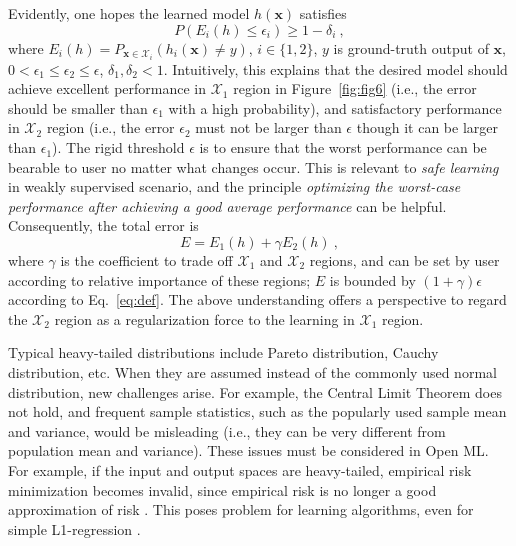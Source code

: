 \documentclass[review,11pt]{ReportTemplate}
\begin{document}
Evidently, one hopes the learned model $h(\bm{x})$ satisfies
\begin{equation}\label{eq:def}
P(E_i(h) \leq \epsilon_i) \geq 1-\delta_i \ ,
\end{equation}
where $E_i(h) = P_{\bm{x} \in \mathcal{X}_i} \left(h_i(\bm{x}) \neq y\right)$, $i \in \{1,2\}$, $y$ is ground-truth output of $\bm{x}$, $0 < \epsilon_1 \le \epsilon_2 \le \epsilon$,  $\delta_1, \delta_2 <1$. Intuitively, this explains that the desired model should achieve excellent performance in $\mathcal{X}_1$ region in Figure~\ref{fig:fig6} (i.e., the error should be smaller than $\epsilon_1$ with a high probability), and satisfactory performance in $\mathcal{X}_2$ region (i.e., the error $\epsilon_2$
must not be larger than $\epsilon$ though it can be larger than $\epsilon_1$). The rigid threshold $\epsilon$ is to ensure that the worst performance can be bearable to user no matter what changes occur. This is relevant to \textit{safe learning} \cite{Li:Zhou2015} in weakly supervised scenario, and the principle \textit{optimizing the worst-case performance after achieving a good average performance} can be helpful. Consequently, the total error is
\begin{equation}
E = E_1(h) + \gamma E_2(h) \ ,
\end{equation}
where $\gamma$ is the coefficient to trade off $\mathcal{X}_1$ and $\mathcal{X}_2$ regions, and can be set by user according to relative importance of these regions; $E$ is bounded by $(1+\gamma)\epsilon$ according to Eq.~\ref{eq:def}. The above understanding offers a perspective to regard the $\mathcal{X}_2$ region as a regularization force to the learning in $\mathcal{X}_1$ region.

Typical heavy-tailed distributions include Pareto distribution, Cauchy distribution, etc. When they are assumed instead of the commonly used normal distribution, new challenges arise. For example, the Central Limit Theorem does not hold, and frequent sample statistics, such as the popularly used sample mean and variance, would be misleading (i.e., they can be very different from population mean and variance). These issues must be considered in Open ML. For example, if the input and output spaces are heavy-tailed, empirical risk minimization becomes invalid, since empirical risk is no longer a good approximation of risk \cite{Catoni2012}. This poses problem for learning algorithms, even for simple L1-regression \cite{Zhang:Zhou2018}.
\end{document}
